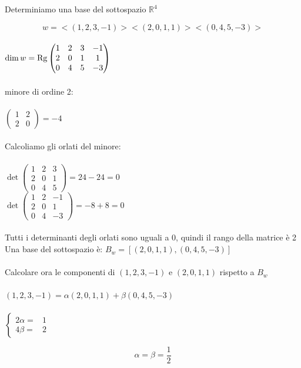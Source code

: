 \begin{esercizio}
	Determiniamo una base del sottospazio $\mathbb{R}^4$ 
	
	$$w=<(1,2,3,-1)><(2,0,1,1)><(0,4,5,-3)>$$
	\leavevmode\\
	$\dim w=\textnormal{Rg}\begin{pmatrix}
		1 & 2 & 3 & -1\\
		2 & 0 & 1 &  1\\
		0 & 4 & 5 & -3\\
	\end{pmatrix}$
	\leavevmode\\\\
	minore di ordine 2:
	\leavevmode\\\\
	$
		\begin{pmatrix}
			1 & 2\\
			2 & 0
		\end{pmatrix}=-4
	$
	\leavevmode\\\\
	Calcoliamo gli orlati del minore:
	\leavevmode\\\\
	$
		\det\begin{pmatrix}
			1 & 2 & 3\\
			2 & 0 & 1\\
			0 & 4 & 5
		\end{pmatrix}=24-24=0
	$
	\leavevmode\\
	$
	\det\begin{pmatrix}
		1 & 2 & -1\\
		2 & 0 &  1\\
		0 & 4 & -3
	\end{pmatrix}=-8+8=0
	$
	\leavevmode\\\\
	Tutti i determinanti degli orlati sono uguali a 0, quindi il rango della matrice è 2
	\leavevmode\\
	Una base del sottospazio è: $B_w=[(2,0,1,1),(0,4,5,-3)]$
	\leavevmode\\\\
	Calcolare ora le componenti di $(1,2,3,-1)$ e $(2,0,1,1)$ rispetto a $B_w$
	\leavevmode\\\\
	$(1,2,3,-1)=\alpha(2,0,1,1)+\beta(0,4,5,-3)$
	\leavevmode\\\\
	$\begin{cases}
		2\alpha=  &  \text{1} \\
		4\beta=  &  \text{2}
	\end{cases}$
	
	$$\alpha=\beta=\frac{1}{2}$$
	\end{esercizio}
	
